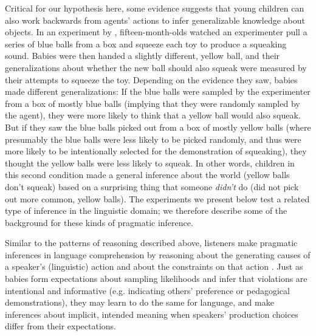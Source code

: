 \documentclass[man]{apa2}
\begin{document}
Critical for our hypothesis here, some evidence suggests that young children can also work backwards from agents' actions to infer generalizable knowledge about objects. In an experiment by , fifteen-month-olds watched an experimenter pull a series of blue balls from a box and squeeze each toy to produce a squeaking sound. Babies were then handed a slightly different, yellow ball, and their generalizations about whether the new ball should also squeak were measured by their attempts to squeeze the toy. Depending on the evidence they saw, babies made different generalizations: If the blue balls were sampled by the experimenter from a box of mostly blue balls (implying that they were randomly sampled by the agent), they were more likely to think that a yellow ball would also squeak. But if they saw the blue balls picked out from a box of mostly yellow balls (where presumably the blue balls were less likely to be picked randomly, and thus were more likely to be intentionally selected for the demonstration of squeaking), they thought the yellow balls were less likely to squeak. In other words, children in this second condition made a general inference about the world (yellow balls don't squeak) based on a surprising thing that someone \emph{didn't} do (did not pick out more common, yellow balls). The experiments we present below test a related type of inference in the linguistic domain; we therefore describe some of the background for these kinds of pragmatic inference. 


Similar to the patterns of reasoning described above, listeners make pragmatic inferences in language comprehension by reasoning about the generating causes of a speaker's (linguistic) action and about the constraints on that action \cite{shafto2012}. Just as babies form expectations about sampling likelihoods and infer that violations are intentional and informative (e.g. indicating others' preference or pedagogical demonstrations), they may learn to do the same for language, and make inferences about implicit, intended meaning when speakers' production choices differ from their expectations. 
\end{document}
